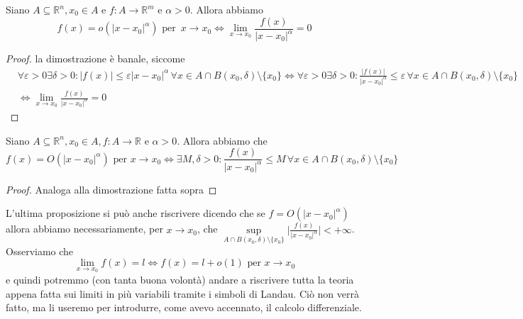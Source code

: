 \begin{prop}
Siano $A \subseteq \mathbb{R}^n, x_0 \in  A$ e $f: A \to \mathbb{R}^m$ e $\alpha > 0$. Allora abbiamo
$$
f(x) = o(|x-x_0|^\alpha) \text{ per } \, x \to x_0 \iff \lim_{x \to x_0} \frac{f(x)}{|x-x_0|^\alpha} = 0
$$
\end{prop}
\begin{proof}
la dimostrazione è banale, siccome 
\begin{align*}
&\forall \varepsilon > 0 \exists \delta > 0: |f(x)| \leq \varepsilon |x-x_0|^\alpha \, \forall x \in A \cap B(x_0, \delta) \setminus \{ x_0 \} \iff \forall \varepsilon > 0 \exists \delta > 0: \frac{|f(x)|}{|x-x_0|^\alpha} \leq \varepsilon \, \forall x \in A \cap B(x_0, \delta) \setminus \{ x_0 \} \\ &\iff \lim_{x \to x_0} \frac{f(x)}{|x-x_0|^\alpha} = 0
\end{align*}
\end{proof}
\begin{prop}
Siano $A \subseteq \mathbb{R}^n, x_0 \in A, f: A \to \mathbb{R}$ e $\alpha > 0$. Allora abbiamo che $$f(x) = O(|x-x_0|^\alpha) \text{ per } x \to x_0 \iff \exists M, \delta > 0: \frac{f(x)}{|x-x_0|^\alpha} \leq M \, \forall x \in A \cap B(x_0, \delta) \setminus \{ x_0 \}$$
\end{prop}
\begin{proof}
Analoga alla dimostrazione fatta sopra
\end{proof}
\noindent L'ultima proposizione si può anche riscrivere dicendo che se $f=O(|x-x_0|^\alpha)$ allora abbiamo necessariamente, per $x \to x_0$, che $\sup\limits_{A \cap B(x_0, \delta) \setminus \{ x_0 \}} \Bigg| \frac{f(x)}{|x-x_0|^{\alpha}} \Bigg| < +\infty$. \\
Osserviamo che
$$
\lim_{x \to x_0} f(x) = l \iff f(x) = l + o(1) \text{ per } x \to x_0
$$
e quindi potremmo (con tanta buona volontà) andare a riscrivere tutta la teoria appena fatta sui limiti in più variabili tramite i simboli di Landau. Ciò non verrà fatto, ma li useremo per introdurre, come avevo accennato, il calcolo differenziale.